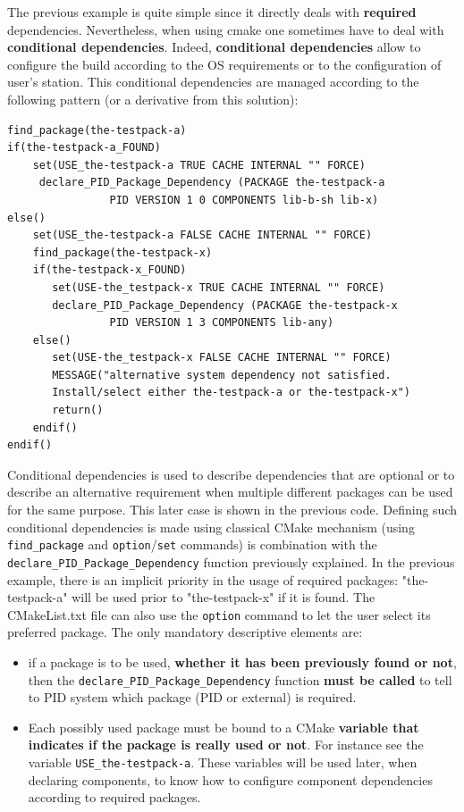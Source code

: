 \documentclass[12pt,a4paper]{article}
\begin{document}
The previous example is quite simple since it directly deals with \textbf{required} dependencies. Nevertheless, when using cmake one sometimes have to deal with \textbf{conditional dependencies}. Indeed, \textbf{conditional dependencies} allow to configure the build according to the OS requirements or to the configuration of user's station. This conditional dependencies are managed according to the following pattern (or a derivative from this solution):
\begin{verbatim}
find_package(the-testpack-a)
if(the-testpack-a_FOUND)
    set(USE_the-testpack-a TRUE CACHE INTERNAL "" FORCE)
     declare_PID_Package_Dependency (PACKAGE the-testpack-a
                PID VERSION 1 0 COMPONENTS lib-b-sh lib-x)
else()
    set(USE_the-testpack-a FALSE CACHE INTERNAL "" FORCE)
    find_package(the-testpack-x)
    if(the-testpack-x_FOUND)
       set(USE-the_testpack-x TRUE CACHE INTERNAL "" FORCE)
       declare_PID_Package_Dependency (PACKAGE the-testpack-x
                PID VERSION 1 3 COMPONENTS lib-any)
    else()
       set(USE-the_testpack-x FALSE CACHE INTERNAL "" FORCE)
       MESSAGE("alternative system dependency not satisfied. 
       Install/select either the-testpack-a or the-testpack-x")
       return()       
    endif()
endif()
\end{verbatim}

Conditional dependencies is used to describe dependencies that are optional or to describe an alternative requirement when multiple different packages can be used for the same purpose. This later case is shown in the previous code. Defining such conditional dependencies is made using classical CMake mechanism (using \texttt{find\_package} and \texttt{option}/\texttt{set} commands) is combination with the \texttt{declare\_PID\_Package\_Dependency} function previously explained. In the previous example, there is an implicit priority in the usage of required packages: "the-testpack-a" will be used prior to "the-testpack-x" if it is found. The CMakeList.txt file can also use the \texttt{option} command to let the user select its preferred package. The only mandatory descriptive elements are:
\begin{itemize}
\item if a package is to be used, \textbf{whether it has been previously found or not}, then the \texttt{declare\_PID\_Package\_Dependency} function \textbf{must be called} to tell to PID system which package (PID or external) is required.
\item Each possibly used package must be bound to a CMake \textbf{variable that indicates if the package is really used or not}. For instance see the variable \texttt{USE\_the-testpack-a}. These variables will be used later, when declaring components, to know how to configure component dependencies according to required packages.
\end{itemize}
\end{document}
